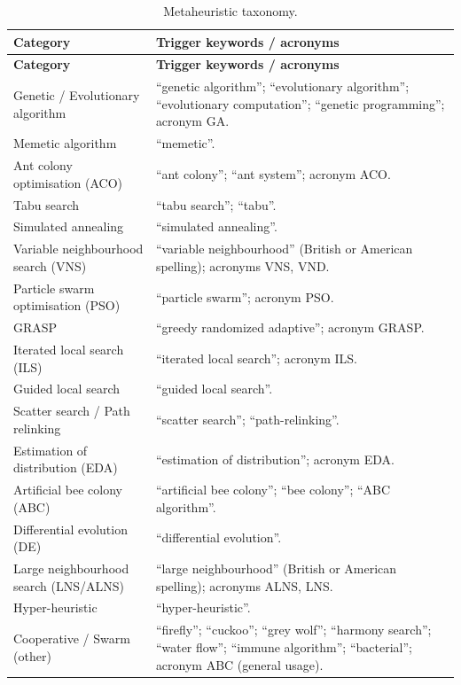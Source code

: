 \documentclass[11pt]{article}
\begin{document}
{\small
\begin{longtable}{@{}p{5.0cm}p{8.6cm}@{}}
\caption{Metaheuristic taxonomy.}\label{tab:metas}\\
\toprule
\textbf{Category} & \textbf{Trigger keywords / acronyms} \\
\midrule
\endfirsthead
\toprule
\textbf{Category} & \textbf{Trigger keywords / acronyms} \\
\midrule
\endhead
Genetic / Evolutionary algorithm &
  ``genetic algorithm''; ``evolutionary algorithm''; ``evolutionary computation'';
  ``genetic programming''; acronym GA. \\
Memetic algorithm & ``memetic''. \\
Ant colony optimisation (ACO) & ``ant colony''; ``ant system''; acronym ACO. \\
Tabu search & ``tabu search''; ``tabu''. \\
Simulated annealing & ``simulated annealing''. \\
Variable neighbourhood search (VNS) &
  ``variable neighbourhood'' (British or American spelling); acronyms VNS, VND. \\
Particle swarm optimisation (PSO) & ``particle swarm''; acronym PSO. \\
GRASP & ``greedy randomized adaptive''; acronym GRASP. \\
Iterated local search (ILS) & ``iterated local search''; acronym ILS. \\
Guided local search & ``guided local search''. \\
Scatter search / Path relinking & ``scatter search''; ``path-relinking''. \\
Estimation of distribution (EDA) & ``estimation of distribution''; acronym EDA. \\
Artificial bee colony (ABC) &
  ``artificial bee colony''; ``bee colony''; ``ABC algorithm''. \\
Differential evolution (DE) & ``differential evolution''. \\
Large neighbourhood search (LNS/ALNS) &
  ``large neighbourhood'' (British or American spelling); acronyms ALNS, LNS. \\
Hyper-heuristic & ``hyper-heuristic''. \\
Cooperative / Swarm (other) &
  ``firefly''; ``cuckoo''; ``grey wolf''; ``harmony search''; ``water flow'';
  ``immune algorithm''; ``bacterial''; acronym ABC (general usage). \\
\bottomrule
\end{longtable}
}
\end{document}
